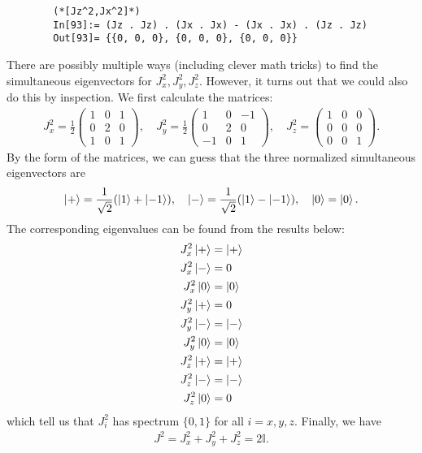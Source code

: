 \documentclass{article}
\theoremstyle{definition}
\newcommand{\f}[2]{\frac{#1}{#2}}
\begin{document}
\begin{enumerate}[label=(\alph*)]
\begin{lstlisting}
		(*[Jz^2,Jx^2]*)
		In[93]:= (Jz . Jz) . (Jx . Jx) - (Jx . Jx) . (Jz . Jz)
		Out[93]= {{0, 0, 0}, {0, 0, 0}, {0, 0, 0}}
	\end{lstlisting}
	There are possibly multiple ways (including clever math tricks) to find the simultaneous eigenvectors for $J_x^2,J_y^2,J_z^2$. However, it turns out that we could also do this by inspection. We first calculate the matrices:
	\begin{align*}
		J_x^2 = \f{1}{2}\begin{pmatrix}
			1 & 0 & 1 \\
			0 & 2 & 0 \\
			1 & 0 & 1
		\end{pmatrix}, \quad 
		J_y^2 = \f{1}{2}\begin{pmatrix}
			1 & 0 &- 1 \\
			0 & 2 & 0 \\
			-1 & 0 & 1
		\end{pmatrix}, \quad
		J_z^2 = \begin{pmatrix}
			1 & 0 & 0 \\
			0 & 0 & 0 \\
			0 & 0 & 1
		\end{pmatrix}.
	\end{align*}
	By the form of the matrices, we can guess that the three normalized simultaneous eigenvectors are
	\begin{align*}
		\ket{+} = \f{1}{\sqrt{2}}(\ket{1} + \ket{-1}), \quad 
		\ket{-} = \f{1}{\sqrt{2}}(\ket{1} - \ket{-1}), \quad
		\ket{0} = \ket{0}.
	\end{align*}
	The corresponding eigenvalues can be found from the results below:
	\begin{align*}
		J_x^2 \ket{+} &= \ket{+} \\
		J_x^2 \ket{-} &= 0\\
		J_x^2 \ket{0} &= \ket{0}\\
		J_y^2 \ket{+} &= 0\\
		J_y^2 \ket{-} &= \ket{-}\\
		J_y^2 \ket{0} &= \ket{0}\\
		J_z^2 \ket{+} &= \ket{+}\\
		J_z^2 \ket{-} &= \ket{-}\\
		J_z^2 \ket{0} &= 0
	\end{align*}
	which tell us that $J_i^2$ has spectrum $\{0,1\}$ for all $i=x,y,z$. Finally, we have
	\begin{align*}
		J^2 = J_x^2 + J_y^2 + J_z^2 = 2\mathbb{I}.
	\end{align*}
	

\end{enumerate}
\end{document}
